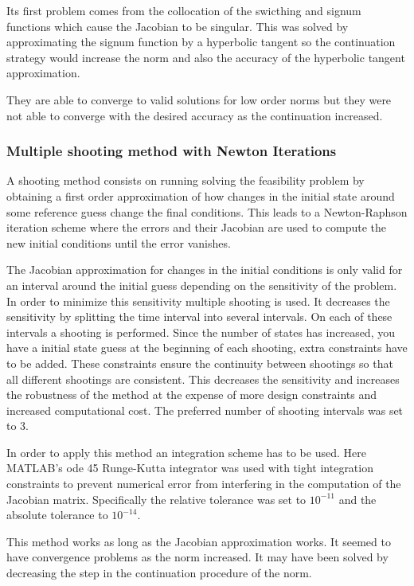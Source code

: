 Its first problem comes from the collocation of the swicthing and signum functions which cause the Jacobian to be singular. This was solved by approximating the signum function by a hyperbolic tangent so the continuation strategy would increase the norm and also the accuracy of the hyperbolic tangent approximation.

They are able to converge to valid solutions for low order norms but they were not able to converge with the desired accuracy as the continuation increased.

\subsubsection{Multiple shooting method with Newton Iterations}
A shooting method consists on running solving the feasibility problem by obtaining a first order approximation of how changes in the initial state around some reference guess change the final conditions. This leads to a Newton-Raphson iteration scheme where the errors and their Jacobian are used to compute the new initial conditions until the error vanishes.

The Jacobian approximation for changes in the initial conditions is only valid for an interval around the initial guess depending on the sensitivity of the problem. In order to minimize this sensitivity multiple shooting is used\cite{stoer20033introduction}. It decreases the sensitivity by splitting the time interval into several intervals. On each of these intervals a shooting is performed. Since the number of states has increased, you have a initial state guess at the beginning of each shooting, extra constraints have to be added. These constraints ensure the continuity between shootings so that all different shootings are consistent. This decreases the sensitivity and increases the robustness of the method at the expense of more design constraints and increased computational cost. The preferred number of shooting intervals was set to 3.

In order to apply this method an integration scheme has to be used. Here MATLAB's ode 45 Runge-Kutta integrator was used with tight integration constraints to prevent numerical error from interfering in the computation of the Jacobian matrix. Specifically the relative tolerance was set to $10^{-11}$ and the absolute tolerance to $10^{-14}$.

This method works as long as the Jacobian approximation works. It seemed to have convergence problems as the norm increased. It may have been solved by decreasing the step in the continuation procedure of the norm.


